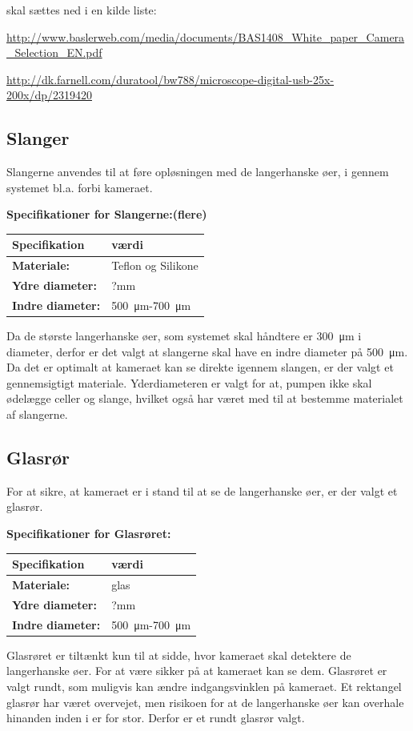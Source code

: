 skal sættes ned i en kilde liste:

\url{http://www.baslerweb.com/media/documents/BAS1408_White_paper_Camera_Selection_EN.pdf}

\url{http://dk.farnell.com/duratool/bw788/microscope-digital-usb-25x-200x/dp/2319420}
 
\subsection{Slanger}
Slangerne anvendes til at føre opløsningen med de langerhanske øer, i gennem systemet bl.a. forbi kameraet.

\textbf{Specifikationer for Slangerne:(flere)} 
\begin{center}
		\begin{longtable}{ | m{6.5cm} | m{6.5cm}| } 
			\hline
			\textbf{Specifikation} &\textbf{værdi} \\ 
			\hline
			\textbf{Materiale:} & Teflon og Silikone \\ 
			\hline
			\textbf{Ydre diameter:} & ?mm  \\ 
			\hline
			\textbf{Indre diameter:} & \SI{500}{\micro\metre}-\SI{700}{\micro\metre}  \\ 
			\hline			
		\end{longtable}
\end{center}

Da de største langerhanske øer, som systemet skal håndtere er \SI{300}{\micro\metre} i diameter, derfor er det valgt at slangerne skal have en indre diameter på \SI{500}{\micro\metre}. Da det er optimalt at kameraet kan se direkte igennem slangen, er der valgt et gennemsigtigt materiale. Yderdiameteren er valgt for at, pumpen ikke skal ødelægge celler og slange, hvilket også har været med til at bestemme materialet af slangerne. 

\subsection{Glasrør}
For at sikre, at kameraet er i stand til at se de langerhanske øer, er der valgt et glasrør.

\textbf{Specifikationer for Glasrøret:} 
\begin{center}
		\begin{longtable}{ | m{6.5cm} | m{6.5cm}| } 
			\hline
			\textbf{Specifikation} &\textbf{værdi} \\ 
			\hline
			\textbf{Materiale:} & glas \\ 
			\hline
			\textbf{Ydre diameter:} & ?mm  \\ 
			\hline
			\textbf{Indre diameter:} & \SI{500}{\micro\metre}-\SI{700}{\micro\metre}  \\ 
			\hline			
		\end{longtable}
\end{center}
Glasrøret er tiltænkt kun til at sidde, hvor kameraet skal detektere de langerhanske øer. For at være sikker på at kameraet kan se dem. Glasrøret er valgt rundt, som muligvis kan ændre indgangsvinklen på kameraet. Et rektangel glasrør har været overvejet, men risikoen for at de langerhanske øer kan overhale hinanden inden i er for stor. Derfor er et rundt glasrør valgt.


